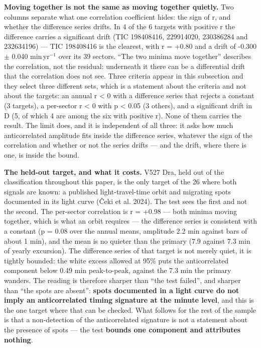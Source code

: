 \documentclass{aa}
\begin{document}
\textbf{Moving together is not the same as moving together quietly.} Two columns separate what one correlation coefficient hides: the sign of r, and whether the difference series drifts. In 4 of the 6 targets with positive r the difference carries a significant drift (TIC 198408416, 229914020, 230386284 and 232634196) --- TIC 198408416 is the clearest, with r = +0.80 and a drift of -0.300 $\pm$ 0.040 min\,yr$^{-1}$ over its 39 sectors. ``The two minima move together'' describes the correlation, not the residual: underneath it there can be a differential drift that the correlation does not see. Three criteria appear in this subsection and they select three different sets, which is a statement about the criteria and not about the targets: an annual r < 0 with a difference series that rejects a constant (3 targets), a per-sector r < 0 with p < 0.05 (3 others), and a significant drift in D (5, of which 4 are among the six with positive r). None of them carries the result. The limit does, and it is independent of all three: it asks how much anticorrelated amplitude fits inside the difference series, whatever the sign of the correlation and whether or not the series drifts --- and the drift, where there is one, is inside the bound.

\textbf{The held-out target, and what it costs.} V527 Dra, held out of the classification throughout this paper, is the only target of the 26 where both signals are known: a published light-travel-time orbit and migrating spots documented in its light curve (Čeki et al. 2024). The test sees the first and not the second. The per-sector correlation is r = +0.98 --- both minima moving together, which is what an orbit requires --- the difference series is consistent with a constant (p = 0.08 over the annual means, amplitude 2.2 min against bars of about 1 min), and the mean is no quieter than the primary (7.9 against 7.3 min of yearly excursion). The difference series of that target is not merely quiet, it is tightly bounded: the white excess allowed at 95\% puts the anticorrelated component below 0.49 min peak-to-peak, against the 7.3 min the primary wanders. The reading is therefore sharper than ``the test failed'', and sharper than ``the spots are absent'': \textbf{spots documented in a light curve do not imply an anticorrelated timing signature at the minute level}, and this is the one target where that can be checked. What follows for the rest of the sample is that a non-detection of the anticorrelated signature is not a statement about the presence of spots --- the test \textbf{bounds one component and attributes nothing}.
\end{document}
